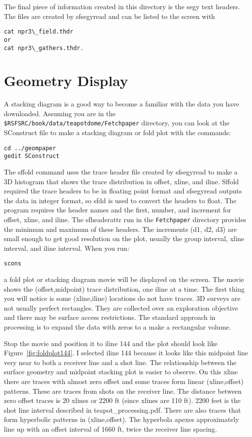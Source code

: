 The final piece of information created in this directory is the segy text headers.   The files are created by sfsegyread and can be listed to the screen with 
\begin{verbatim}
cat npr3\_field.thdr 
or 
cat npr3\_gathers.thdr.  
\end{verbatim}

\section{Geometry Display}
A stacking diagram is a good way to become a familiar with the data you have downloaded.  Assuming you are in the \texttt{\$RSFSRC/book/data/teapotdome/Fetchpaper} directory, you can look at the SConstruct file to make a stacking diagram or fold plot with the commands:
\begin{verbatim}  
cd ../geompaper
gedit SConstruct
\end{verbatim}  
 
The sffold command uses the trace header file created by sfsegyread to make a 3D histogram that shows the trace distribution in offset, xline, and iline.  Sffold required the trace headers to be in floating point format and sfsegyread outputs the data in integer format, so sfdd is used to convert the headers to float.  The program requires the header names and the first, number, and increment for offset, xline, and iline.  The sfheaderattr run in the \texttt{Fetchpaper} directory provides the minimum and maximum of these headers.  The increments (d1, d2, d3) are small enough to get good resolution on the plot, usually the group interval, xline interval, and iline interval.  When you run:
\begin{verbatim}  
scons
\end{verbatim}  

a fold plot or stacking diagram movie will be displayed on the screen.  The movie shows the (offset,midpoint) trace distribution, one iline at a time. The first thing you will notice is some (xline,iline) locations do not have traces.  3D surveys are not usually perfect rectangles.  They are collected over an exploration objective and there may be surface access restrictions.  The standard approach in processing is to expand the data with zeros to a make a rectangular volume.

Stop the movie and position it to iline 144 and the plot should look like Figure~\ref{fig:foldplot144}.  I selected iline 144 because it looks like this midpoint line very near to both a receiver line and a shot line.   The relationship between the surface geometry and midpoint stacking plot is easier to observe.  On this xline there are traces with almost zero offset and some traces form linear (xline,offset) patterns.  These are traces from shots on the receiver line.  The distance between zero offset traces is 20 xlines or 2200 ft (since xlines are 110 ft).  2200 feet is the shot line interval described in teapot\_processing.pdf.  There are also traces that form hyperbolic patterns in (xline,offset).  The hyperbola apexes approximately line up with an offset interval of 1660 ft, twice the receiver line spacing.

